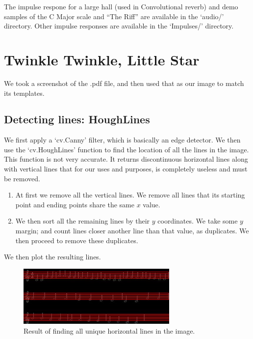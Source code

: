 \documentclass[12pt]{article}
\begin{document}
The impulse respone for a large hall (used in Convolutional reverb) and demo samples of the C Major scale and ``The Riff''
are available in the `audio/' directory. Other impulse responses are available in the `Impulses/' directory.

\pagebreak

\section{Twinkle Twinkle, Little Star}
We took a screenshot of the .pdf file, and then used that as our image to match its templates.

\subsection{Detecting lines: HoughLines}
We first apply a `cv.Canny' filter, which is basically an edge detector. We then use the
`cv.HoughLines' function to find the location of all the lines in the image. This function
is not very accurate. It returns discontinuous horizontal lines along with vertical lines that
for our uses and purposes, is completely useless and must be removed. 

\begin{enumerate}
    \item At first we remove all the vertical lines. We remove all lines that its starting point and ending points
    share the same $x$ value.
    \item We then sort all the remaining lines by their $y$ coordinates. We take some $y$ margin;
    and count lines closer another line than that value, as duplicates. We then proceed to remove these duplicates.
\end{enumerate}

We then plot the resulting lines.

\begin{figure}[h!]
    \centering
    \includegraphics[width=0.7\textwidth]{houghlines.JPG}
    \caption{Result of finding all unique horizontal lines in the image.}
    \label{fig:2}
\end{figure}
\end{document}
